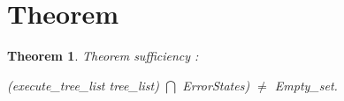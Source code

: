 \documentclass[a4paper]{article}
\newtheorem{thm}{Theorem}
\begin{document}
\section{Theorem}
\begin{thm}
Theorem sufficiency : 

(execute\_tree\_list tree\_list) $\bigcap$ ErrorStates)
$\neq$ Empty\_set.
\end{thm}
%
%
%
%
%
%
%
%
%
\end{document}
